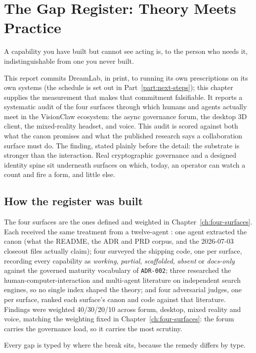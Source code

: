 \chapter{The Gap Register: Theory Meets Practice}
\label{ch:gap-register}

\epigraph{A capability you have built but cannot see acting is, to the person who needs it, indistinguishable from one you never built.}{}

This report commits DreamLab, in print, to running its own prescriptions on its own systems (the schedule is set out in Part~\ref{part:next-steps}); this chapter supplies the measurement that makes that commitment falsifiable. It reports a systematic audit of the four surfaces through which humans and agents actually meet in the VisionClaw ecosystem: the async governance forum, the desktop 3D client, the mixed-reality headset, and voice. This audit is scored against both what the canon promises and what the published research says a collaboration surface must do. The finding, stated plainly before the detail: the substrate is stronger than the interaction. Real cryptographic governance and a designed identity spine sit underneath surfaces on which, today, an operator can watch a count and fire a form, and little else.

\section{How the register was built}

The four surfaces are the ones defined and weighted in Chapter~\ref{ch:four-surfaces}. Each received the same treatment from a twelve-agent : one agent extracted the canon (what the README, the ADR and PRD corpus, and the 2026-07-03 closeout files actually claim); four surveyed the shipping code, one per surface, recording every capability as \emph{working}, \emph{partial}, \emph{scaffolded}, \emph{absent} or \emph{docs-only} against the governed maturity vocabulary of \texttt{ADR-002}; three researched the human-computer-interaction and multi-agent literature on independent search engines, so no single index shaped the theory; and four adversarial judges, one per surface, ranked each surface's canon and code against that literature. Findings were weighted 40/30/20/10 across forum, desktop, mixed reality and voice, matching the weighting fixed in Chapter~\ref{ch:four-surfaces}: the forum carries the governance load, so it carries the most scrutiny.

Every gap is typed by where the break sits, because the remedy differs by type.

